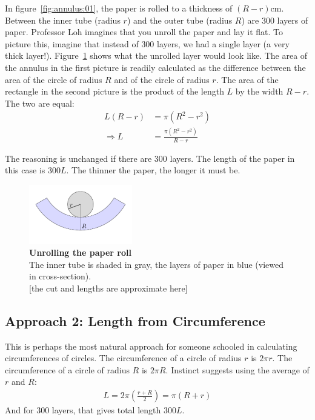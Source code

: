 \documentclass[12pt, a4]{article}
\begin{document}
In figure~\ref{fig:annulus:01}, the paper is rolled to a thickness of $(R-r)$cm. Between the inner tube (radius $r$) and the outer tube (radius $R$) are $300$ layers of paper. Professor Loh imagines that you unroll the paper and lay it flat. To picture this, imagine that instead of $300$ layers, we had a single layer (a very thick layer!). Figure~\ref{fig:annulus:02} shows what the unrolled layer would look like. The area of the annulus in the first picture is readily calculated as the difference between the area of the circle of radius $R$ and of the circle of radius $r$. The area of the rectangle in the second picture is the product of the length $L$ by the width $R-r$. The two are equal:
\begin{align*}
L(R-r) & = \pi(R^{2}-r^{2}) \\ 
\Rightarrow 
L & = \frac{\pi(R^{2}-r^{2})}{R-r}
\end{align*}

The reasoning is unchanged if there are $300$ layers. The length of the paper in this case is $300L$. The thinner the paper, the longer it must be. 


\begin{figure}[hpbt]
\begin{minipage}[b]{\textwidth}
\centering
\includegraphics[width=0.4\textwidth]
{annulus_tikz_2}
\caption{\textbf{Unrolling the paper roll} \\
The inner tube is shaded in gray, the layers of paper in blue (viewed in cross-section). \\
{\footnotesize [the cut and lengths are approximate here]}
\label{fig:annulus:02}}
\end{minipage}
\end{figure}


\newpage
\subsection*{Approach 2: Length from Circumference}
This is perhaps the most natural approach for someone schooled in calculating circumferences of circles. The circumference of a circle of radius $r$ is $2\pi r$. The circumference of a circle of radius $R$ is $2\pi R$. Instinct suggests using the average of $r$ and $R$:
\begin{align*}
L = 2 \pi \left(\frac{r+R}{2}\right) = \pi (R + r)
\end{align*}
And for $300$ layers, that gives total length $300L$.
\end{document}
